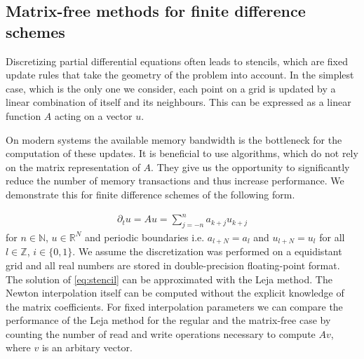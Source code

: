 \documentclass{scrartcl}
\begin{document}


\subsection{Matrix-free methods for finite difference schemes} \label{sec:FDS}
Discretizing partial differential equations often leads to stencils, which are fixed update rules that take the geometry of the problem into account. In the simplest case, which is the only one we consider, each point on a grid is updated by a linear combination of itself and its neighbours. This can be expressed as a linear function $A$ acting on a vector $u$. 


On modern systems the available memory bandwidth is the bottleneck for the computation of these updates. It is beneficial to use algorithms, which do not rely on the matrix representation of $A$. They give us the opportunity to significantly reduce the number of memory transactions and thus increase performance. We demonstrate this for finite difference schemes of the following form.

\begin{align}
\partial_{t}u = Au = \sum_{j=-n}^{n} a_{k+j}u_{k+j} \label{eq:stencil}
\end{align}
for $n\in\mathbb{N}$, $u\in\mathbb{R}^N$ and periodic boundaries i.e. $a_{l+N} = a_{l}$ and $u_{l+N}=u_{l}$ for all $l\in\mathbb{Z}$, $i\in\{0,1\}$.
We assume the discretization was performed on a equidistant grid and all real numbers are stored in double-precision floating-point format.
The solution of \eqref{eq:stencil} can be approximated with the Leja method. The Newton interpolation itself can be computed without the explicit knowledge of the matrix coefficients. For fixed interpolation parameters we can compare the performance of the Leja method for the regular and the matrix-free case by counting the number of read and write operations necessary to compute $Av$, where $v$ is an arbitary vector.
\end{document}
